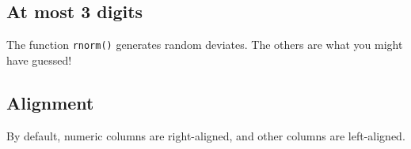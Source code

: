 \documentclass[titlepage]{book}\usepackage{knitr}
\begin{document}
\begin{knitrout}
\color{fgcolor}\begin{kframe}
\begin{alltt}
\hlstd{(} \hlstd{=}\hlstd{)}
\end{alltt}
\end{kframe}
\end{knitrout}

\subsection{At most 3 digits}

\begin{knitrout}
\color{fgcolor}\begin{kframe}
\begin{alltt}
\hlstd{(}\hlstd{(} \hlstd{=} \hlstd{(}\hlstd{),}  \hlstd{=} \hlstd{(}\hlstd{),}  \hlstd{=} \hlstd{(}\hlstd{,} \hlstd{,} \hlstd{),}  \hlstd{=} \hlstd{(}\hlstd{,} \hlstd{)))}
\end{alltt}
\end{kframe}
\end{knitrout}
The function \texttt{rnorm()} generates random deviates. The others are what you might have guessed!

\subsection{Alignment}

By default, numeric columns are right-aligned, and other columns are
left-aligned.

\begin{knitrout}
\color{fgcolor}\begin{kframe}
\begin{alltt}
\hlstd{(} \hlstd{=}\hlstd{(}\hlstd{,} \hlstd{,} \hlstd{,} \hlstd{,} \hlstd{))}
\end{alltt}
\end{kframe}
\end{knitrout}
\end{document}
